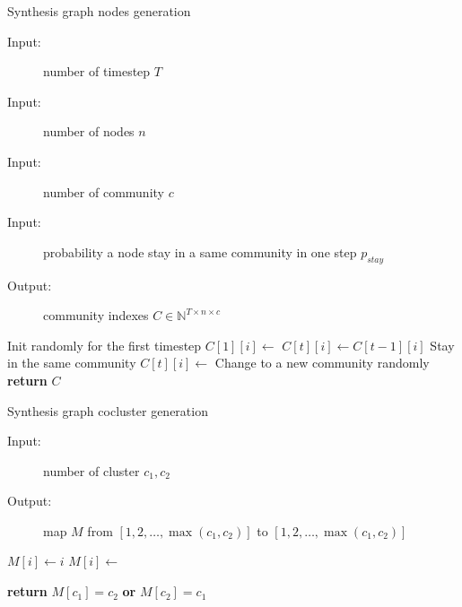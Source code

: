 \begin{algorithm}
	\noindent
	\caption{Synthesis graph nodes generation}
	\label{alg:appendix-synthesis_graph_nodes}
	\begin{description}
		\item[Input:] number of timestep $T$
		\item[Input:] number of nodes $n$
		\item[Input:] number of community $c$
		\item[Input:] probability a node stay in a same community in one step $p_{stay}$
		\item[Output:] community indexes $C \in \mathbb{N}^{T \times n \times c}$
	\end{description}
	\begin{algorithmic}[1]
		\Comment Init randomly for the first timestep
		\State $C[1][i] \gets$ 
		\EndFor
		\State $C[t][i] \gets C[t-1][i]$
		\Comment Stay in the same community
		\Else
		\State $C[t][i] \gets$ 
		\Comment Change to a new community randomly
		\EndIf
		\EndFor
		\EndFor
		\State \textbf{return} $C$
		\EndFunction
	\end{algorithmic}
\end{algorithm}


\begin{algorithm}
	\caption{Synthesis graph cocluster generation}
	\label{alg:appendix-synthesis_graph_cocluster}
	\begin{description}
		\item[Input:] number of cluster $c_1, c_2$
		\item[Output:] map $M$ from $[1, 2, \ldots, \max(c_1, c_2)]$ to $[1, 2, \ldots, \max(c_1, c_2)]$
	\end{description}
	\begin{algorithmic}[1]
		\State $M[i] \gets i$
		\EndFor
		\State $M[i] \gets$ 
		\EndFor
		\EndFunction
	\end{algorithmic}
	\begin{algorithmic}[1]
		\State \textbf{return} $M[c_1] = c_2$ \textbf{or} $M[c_2] = c_1$
		\EndFunction
	\end{algorithmic}
\end{algorithm}


